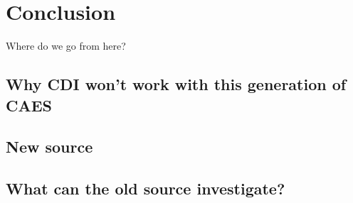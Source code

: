 
%










\chapter{Conclusion}

Where do we go from here?

\section{Why CDI won't work with this generation of CAES}

\section{New source}

\section{What can the old source investigate?}


